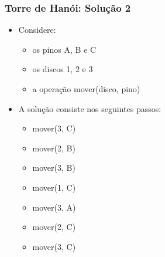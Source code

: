 \documentclass[aspectratio=169]{beamer}
\begin{document}
\begin{frame}\frametitle{Torre de Hanói: Solução 2}
\begin{itemize}
	\item Considere:
	\begin{itemize}
		\item os pinos A, B e C
		\item os discos 1, 2 e 3
		\item a operação mover(disco, pino)
	\end{itemize}
	\item A solução consiste nos seguintes passos:
	\begin{itemize}
		\item mover(3, C)
		\item mover(2, B)
		\item mover(3, B)
		\item mover(1, C)
		\item mover(3, A)
		\item mover(2, C)
		\item mover(3, C)
	\end{itemize}
\end{itemize}
\end{frame}
\end{document}
